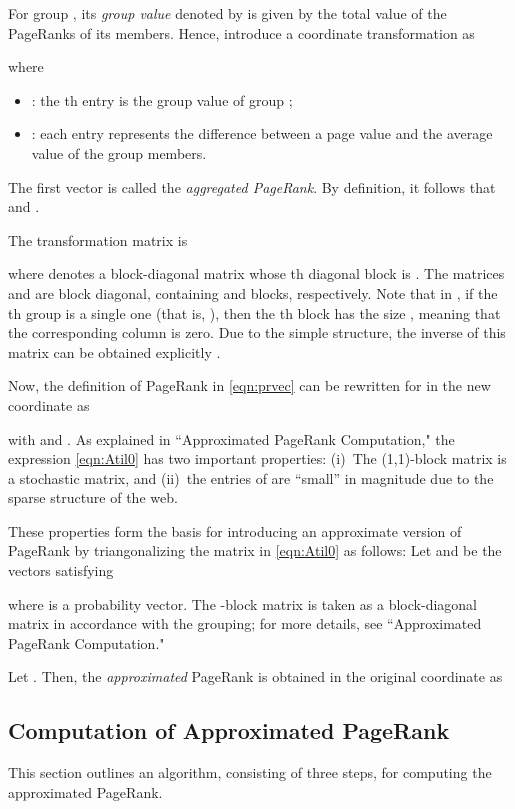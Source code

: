 \documentclass[11pt,draftcls,onecolumn]{IEEEtran}
\begin{document}
For group , its \textit{group value} denoted by  
is given by the total value of the PageRanks  of its members. 
Hence, introduce a coordinate transformation as

where
\begin{itemize}
 \item : the th entry is the group value of group ;
 \item : each entry represents the difference between 
                                   a page value and the average value of the group members.
\end{itemize}
The first vector  is called the \textit{aggregated PageRank}.
By definition, it follows that  and
.

The transformation matrix  is

where  denotes a block-diagonal matrix
whose th diagonal block is .
The matrices  and  are block diagonal,
containing  and  blocks, respectively. 
Note that in , if the th group is a single one
(that is, ), then the th block has the size
, meaning that the corresponding column is zero. 
Due to the simple structure, the inverse of this matrix  
can be obtained explicitly \cite{IshTemBai:12}.  



Now, the definition of PageRank in \eqref{eqn:prvec} can 
be rewritten for  in the new coordinate as

with  and
.
As explained in ``Approximated PageRank Computation,"
the expression \eqref{eqn:Atil0} has two 
important properties: (i)~The (1,1)-block matrix  is 
a stochastic matrix, and (ii)~the entries of  are
``small'' in magnitude due to the sparse structure of the web. 

These properties form the basis for introducing an approximate version of
PageRank by triangonalizing the matrix  in \eqref{eqn:Atil0} as follows: 
Let  and  be
the vectors satisfying 

where  is a probability vector.
The -block matrix 
is taken as a block-diagonal matrix in accordance with the grouping;
for more details, see ``Approximated PageRank Computation."

Let .
Then, the \textit{approximated} PageRank is obtained in the original coordinate as


\subsection*{Computation of Approximated PageRank}

This section outlines an algorithm, consisting of three steps, for computing the approximated PageRank.
\end{document}
